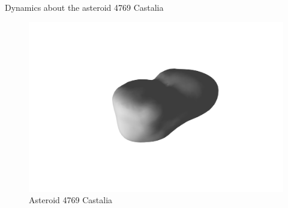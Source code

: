 \documentclass[final, usenames, dvipsnames]{beamer}
\newlength{\twocolwidth}
\begin{document}
\begin{frame}[t]
\begin{columns}[T]
\begin{column}{\twocolwidth}
\begin{block}{Dynamics about the asteroid 4769 Castalia}
\begin{minipage}{0.5\columnwidth}
\begin{itemize}
\begin{itemize}
            \end{itemize}
        \end{itemize}
		\begin{figure}
			\includegraphics[trim={8cm 3cm 7cm 3cm},clip,width=0.5\columnwidth]{figures/castalia.pdf}
			\caption*{Asteroid 4769 Castalia}
		\end{figure}
	\end{minipage}%
\vspace{1.3cm}
\end{block} %


\end{column}
\end{columns}
\end{frame}
\end{document}
